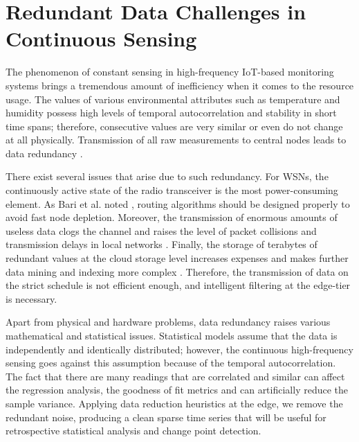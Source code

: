 \section{Redundant Data Challenges in Continuous Sensing}
The phenomenon of constant sensing in high-frequency IoT-based monitoring systems brings a tremendous amount of inefficiency when it comes to the resource usage. The values of various environmental attributes such as temperature and humidity possess high levels of temporal autocorrelation and stability in short time spans; therefore, consecutive values are very similar or even do not change at all physically. Transmission of all raw measurements to central nodes leads to data redundancy \cite{ref5, ref25, ref45, ref7, ref27, ref47}.

There exist several issues that arise due to such redundancy. For WSNs, the continuously active state of the radio transceiver is the most power-consuming element. As Bari et al. noted \cite{ref14, ref34, ref54}, routing algorithms should be designed properly to avoid fast node depletion. Moreover, the transmission of enormous amounts of useless data clogs the channel and raises the level of packet collisions and transmission delays in local networks \cite{ref13, ref33, ref53}. Finally, the storage of terabytes of redundant values at the cloud storage level increases expenses and makes further data mining and indexing more complex \cite{ref8, ref28, ref48}. Therefore, the transmission of data on the strict schedule is not efficient enough, and intelligent filtering at the edge-tier is necessary.

Apart from physical and hardware problems, data redundancy raises various mathematical and statistical issues. Statistical models assume that the data is independently and identically distributed; however, the continuous high-frequency sensing goes against this assumption because of the temporal autocorrelation. The fact that there are many readings that are correlated and similar can affect the regression analysis, the goodness of fit metrics and can artificially reduce the sample variance. Applying data reduction heuristics at the edge, we remove the redundant noise, producing a clean sparse time series that will be useful for retrospective statistical analysis and change point detection.

